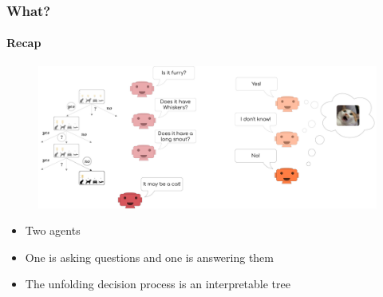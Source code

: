 \documentclass[9pt]{beamer}
\begin{document}
\begin{frame}
\frametitle{What?}
\framesubtitle{Recap}
\begin{figure}
	\centering
	\includegraphics[width=1\textwidth]{images/urdtc_intuition.pdf}
\end{figure}
\begin{itemize}\setlength\itemsep{1em}
	\item Two agents
	\item One is asking questions and one is answering them
	\item The unfolding decision process is an interpretable tree
\end{itemize}
\end{frame} 
\end{document}
